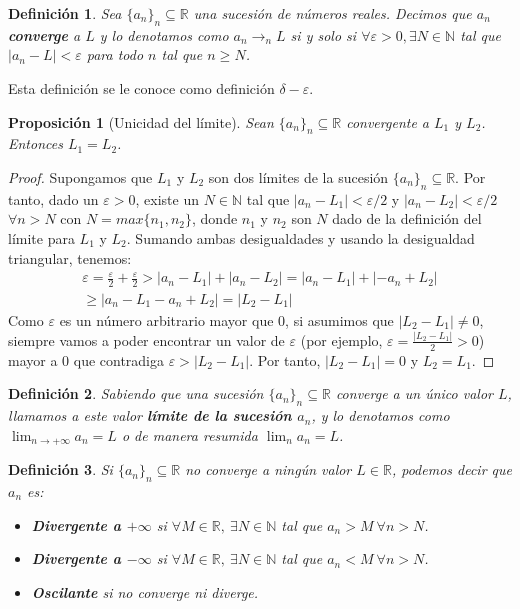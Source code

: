 \documentclass{article}
\newtheorem{prop}{Proposición}
\newtheorem{define}{Definición}
\begin{document}
\begin{define}
	Sea $\{ a_n\}_n \subseteq \mathbb{R}$ una sucesión de números reales. Decimos que $a_n$ \textbf{converge} a $L$ y lo denotamos como $a_n \rightarrow_{n} L$ si y solo si 
	$\forall \varepsilon > 0,\exists N \in \mathbb{N}$ tal que $|a_n - L| < \varepsilon$ para todo $n$ tal que $n \geq N$.
\end{define}
Esta definición se le conoce como definición $\delta-\varepsilon$.

\begin{prop}[Unicidad del límite]
	Sean $\{ a_n\}_n \subseteq \mathbb{R}$ convergente a $L_1$ y $L_2$. Entonces $L_1 = L_2$.
\end{prop}
\begin{proof}
	Supongamos que $L_1$ y $L_2$ son dos límites de la sucesión $\{ a_n\}_n \subseteq \mathbb{R}$. Por tanto, dado un $\varepsilon > 0$, existe un $N \in \mathbb{N}$ 
	tal que $|a_n - L_1| < \varepsilon/2$ y $|a_n - L_2| < \varepsilon/2\ $ $\forall n > N$ con $N=max\{n_1, n_2\}$, donde $n_1$ y $n_2$ son $N$ dado de la definición del límite para 
	$L_1$ y $L_2$. Sumando ambas desigualdades y usando la desigualdad triangular, tenemos:
	\begin{align*}
		\varepsilon = \frac{\varepsilon}{2} + \frac{\varepsilon}{2} > |a_n - L_1| + |a_n - L_2| = |a_n - L_1| + |-a_n + L_2| \\ \geq |a_n - L_1 - a_n + L_2| = |L_2 - L_1|
	\end{align*}
	Como $\varepsilon$ es un número arbitrario mayor que 0, si asumimos que $|L_2 - L_1| \neq 0$, siempre vamos a poder encontrar un valor de $\varepsilon$ (por ejemplo, 
	$\varepsilon = \frac{|L_2 - L_1|}{2} > 0$) mayor a 0 que contradiga $\varepsilon > |L_2 - L_1|$. Por tanto, $|L_2 - L_1| = 0$ y $L_2 = L_1$.
\end{proof}


\begin{define}
	Sabiendo que una sucesión $\{ a_n\}_n \subseteq \mathbb{R}$ converge a un único valor $L$, llamamos a este valor \textbf{límite de la sucesión $a_n$}, y lo denotamos como
	$\lim_{n\rightarrow +\infty} a_n = L$ o de manera resumida $\lim_{n} a_n = L$.
\end{define}


\begin{define}
	Si $\{ a_n\}_n \subseteq \mathbb{R}$ no converge a ningún valor $L\in\mathbb{R}$, podemos decir que $a_n$ es:
	\begin{itemize}
		\item
		\textbf{Divergente a $+\infty$} si $\forall M \in \mathbb{R},\ \exists N \in \mathbb{N}$ tal que $a_n > M\ \forall n>N$.
		
		\item
		\textbf{Divergente a $-\infty$} si $\forall M \in \mathbb{R},\ \exists N \in \mathbb{N}$ tal que $a_n < M\ \forall n>N$.
		
		\item
		\textbf{Oscilante} si no converge ni diverge.
	\end{itemize}
\end{define}
\end{document}
